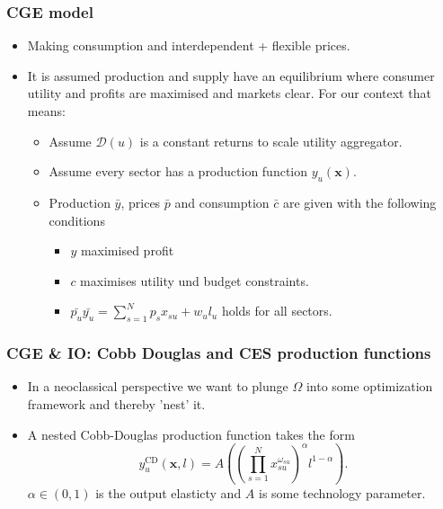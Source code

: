 \documentclass[utf8,aspectratio=169,ngerman,english]{beamer}
\begin{document}
\begin{frame} 
  \frametitle{CGE model}
  \begin{itemize}
    \item Making consumption and interdependent + flexible prices.
    \item It is assumed production and supply have an equilibrium where consumer utility and profits are maximised and markets clear.
      For our context that means:
      \begin{itemize}
        \item Assume $\mathcal D(u)$ is a constant returns to scale utility aggregator. 
        \item Assume every sector has a production function $y_u(\mathbf x)$.
        \item Production $\bar y$, prices $\bar p$ and consumption $\bar c$ are given with the following conditions
          \begin{itemize}
            \item  $y$ maximised profit 
            \item $c$ maximises utility und budget constraints.
            \item  $ \bar {p_u} \bar{y_u} = \sum_{s=1}^N p_s x_{su} + w_u l_u$ holds for all sectors.
          \end{itemize}
      \end{itemize}
  \end{itemize}
\end{frame}



\begin{frame}
\frametitle{CGE \& IO: Cobb Douglas and CES production functions }
\begin{itemize}
  \item In a neoclassical perspective we want to plunge $\Omega$ into some optimization framework and thereby 'nest' it.
  \item A nested Cobb-Douglas production function takes the form 
    $$ y_u^{\text{CD}}(\mathbf x,l) = A \left(\left(\prod_{s = 1}^N x_{su}^{\omega_{su}} \right)^\alpha l^{1 - \alpha} \right).$$
    $\alpha \in (0,1)$ is the output elasticty and $A$ is some technology parameter.
\end{itemize}
\end{frame}
\end{document}
